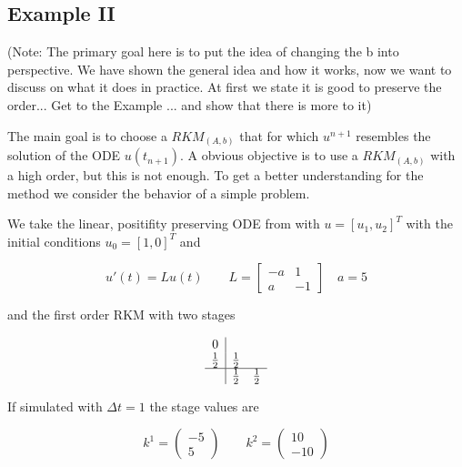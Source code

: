 \documentclass{article}
\begin{document}
\subsection{Example II}\label{sec:example_lin}

(Note: The primary goal here is to put the idea of changing the b into perspective. We have shown the general idea and how it works, now we want to discuss on what it does in practice. At first we state it is good to preserve the order... Get to the Example ... and show that there is more to it)


The main goal is to choose a $RKM_{(A,b)}$ that for which $u^{n+1}$ resembles the solution of the ODE $u(t_{n+1})$. 
A obvious objective is to use a $RKM_{(A,b)}$ with a high order, but this is not enough.
To get a better understanding for the method we consider the behavior of a simple problem.   

We take the linear, positifity preserving ODE from \cite{kopecz_unconditionally_2018} with $u = [u_1,u_2]^T$ with the initial conditions $u_0 = [1,0]^T$ and

\begin{equation}
u'(t) = L u(t) \qquad L = \left[\begin{matrix}- a & 1\\a & -1\end{matrix}\right] \quad a =5
\end{equation}

and the first order RKM with two stages

\begin{align}
\begin{array}{c|cc}
0 &  & \\
\frac{1}{2} & \frac{1}{2} & \\
\hline
 & \frac{1}{2} & \frac{1}{2}\\
\end{array}
\end{align}

If simulated with $\Delta t = 1$ the stage values are 

\begin{equation}
k^1 = \left(\begin{matrix}-5\\5\end{matrix}\right) \qquad k^2 = \left(\begin{matrix}10\\-10\end{matrix}\right)
\end{equation}
\end{document}
